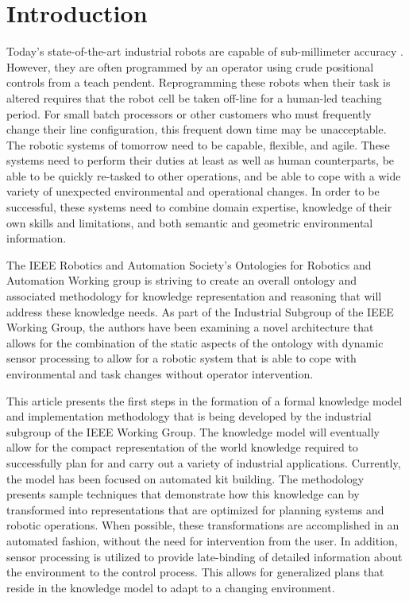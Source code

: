 \documentclass[preprint,12pt]{elsarticle}
\begin{document}

\section{Introduction}
\label{sect:introduction}
Today's state-of-the-art industrial robots are capable of sub-millimeter accuracy \cite{RobotAccuracy}.
However, they are often programmed by an operator using crude positional controls from a teach pendent. 
Reprogramming these robots when their task is altered requires that the robot cell be taken off-line for a
human-led teaching period.  For small batch processors or other customers who must frequently change
their line configuration, this frequent down time may be unacceptable. 
The robotic systems of tomorrow
need to be capable, flexible, and agile.  These systems need to perform their duties at least 
as well as human counterparts, be able to be quickly re-tasked to other operations,
and be able to cope with a wide variety of unexpected environmental and operational changes. 
In order to be successful, these systems need to combine domain expertise,
knowledge of their own skills and limitations, and both semantic and geometric environmental information.

The IEEE Robotics and Automation Society's Ontologies for Robotics and Automation Working group is 
striving to create an overall ontology and
associated methodology for knowledge representation and reasoning that will address these 
knowledge needs. As part of the
Industrial Subgroup of the IEEE Working Group, the authors have been examining a novel 
architecture that allows for the combination of the static
aspects of the ontology with dynamic sensor processing to allow for a robotic system that 
is able to cope with environmental and task changes
without operator intervention.

This article presents the first steps in the formation of a formal knowledge model and implementation methodology
that is being developed by the industrial subgroup
of the IEEE Working Group. The knowledge model will eventually allow for the compact representation
of the world knowledge required to successfully plan for and carry out a variety of industrial applications. Currently,
the model has been focused on automated kit building.
The methodology presents sample techniques that demonstrate how this knowledge can by transformed
into representations that are optimized for planning systems and robotic operations. When possible,
these transformations are accomplished in an automated fashion, without the need for intervention from
the user. In addition, sensor processing is utilized to provide late-binding of detailed information
about the environment to the control process. This allows for generalized plans that reside in the knowledge
model to adapt to a changing environment.
\end{document}
